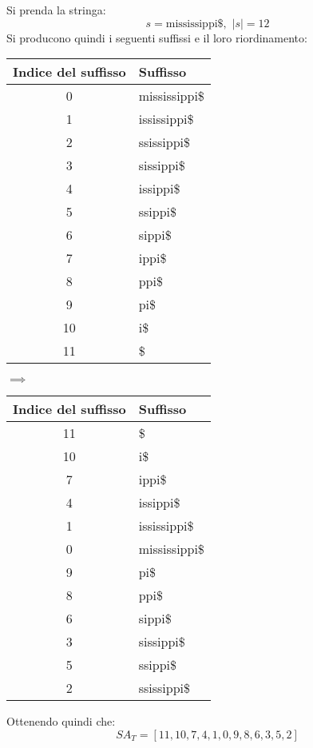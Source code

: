 \begin{esempio}
  Si prenda la stringa:
  \[s=\mbox{mississippi\$},\,\,|s|=12\]
  Si producono quindi i seguenti suffissi e il loro riordinamento:
  \begin{table}[H]
    \footnotesize
    \centering
    \begin{tabular}{c|l}
      \textbf{Indice del suffisso} & \textbf{Suffisso}\\
      \hline
      0 & mississippi\$\\
      1 & ississippi\$\\
      2 & ssissippi\$\\
      3 & sissippi\$\\
      4 & issippi\$\\
      5 & ssippi\$\\
      6 & sippi\$\\
      7 & ippi\$\\
      8 & ppi\$\\
      9 & pi\$\\
      10 & i\$\\
      11 & \$\\
    \end{tabular}
    \quad $\implies$\quad
    \begin{tabular}{c|l} 
      \textbf{Indice del suffisso} & \textbf{Suffisso}\\ 
      \hline
      11 & \$\\
      10 & i\$\\
      7 & ippi\$\\
      4 & issippi\$\\
      1 & ississippi\$\\
      0 & mississippi\$\\
      9 & pi\$\\
      8 & ppi\$\\
      6 & sippi\$\\
      3 & sissippi\$\\
      5 & ssippi\$\\
      2 & ssissippi\$\\
    \end{tabular}
  \end{table}
  Ottenendo quindi che:
  \[SA_T=[11,10,7,4,1,0,9,8,6,3,5,2]\]
\end{esempio}
